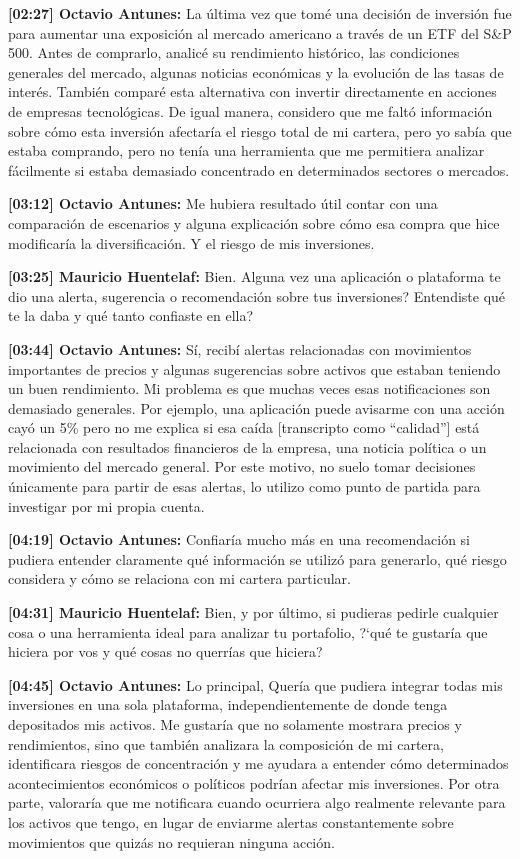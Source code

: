 \par\noindent\textbf{[02:27] Octavio Antunes:} La última vez que tomé una decisión de inversión fue para aumentar una exposición al mercado americano a través de un ETF del S\&P 500. Antes de comprarlo, analicé su rendimiento histórico, las condiciones generales del mercado, algunas noticias económicas y la evolución de las tasas de interés. También comparé esta alternativa con invertir directamente en acciones de empresas tecnológicas. De igual manera, considero que me faltó información sobre cómo esta inversión afectaría el riesgo total de mi cartera, pero yo sabía que estaba comprando, pero no tenía una herramienta que me permitiera analizar fácilmente si estaba demasiado concentrado en determinados sectores o mercados.
\par\noindent\textbf{[03:12] Octavio Antunes:} Me hubiera resultado útil contar con una comparación de escenarios y alguna explicación sobre cómo esa compra que hice modificaría la diversificación. Y el riesgo de mis inversiones.
\par\noindent\textbf{[03:25] Mauricio Huentelaf:} Bien. Alguna vez una aplicación o plataforma te dio una alerta, sugerencia o recomendación sobre tus inversiones? Entendiste qué te la daba y qué tanto confiaste en ella?
\par\noindent\textbf{[03:44] Octavio Antunes:} Sí, recibí alertas relacionadas con movimientos importantes de precios y algunas sugerencias sobre activos que estaban teniendo un buen rendimiento. Mi problema es que muchas veces esas notificaciones son demasiado generales. Por ejemplo, una aplicación puede avisarme con una acción cayó un 5\% pero no me explica si esa caída [transcripto como \enquote{calidad}] está relacionada con resultados financieros de la empresa, una noticia política o un movimiento del mercado general. Por este motivo, no suelo tomar decisiones únicamente para partir de esas alertas, lo utilizo como punto de partida para investigar por mi propia cuenta.
\par\noindent\textbf{[04:19] Octavio Antunes:} Confiaría mucho más en una recomendación si pudiera entender claramente qué información se utilizó para generarlo, qué riesgo considera y cómo se relaciona con mi cartera particular.
\par\noindent\textbf{[04:31] Mauricio Huentelaf:} Bien, y por último, si pudieras pedirle cualquier cosa o una herramienta ideal para analizar tu portafolio, ?`qué te gustaría que hiciera por vos y qué cosas no querrías que hiciera?
\par\noindent\textbf{[04:45] Octavio Antunes:} Lo principal, Quería que pudiera integrar todas mis inversiones en una sola plataforma, independientemente de donde tenga depositados mis activos. Me gustaría que no solamente mostrara precios y rendimientos, sino que también analizara la composición de mi cartera, identificara riesgos de concentración y me ayudara a entender cómo determinados acontecimientos económicos o políticos podrían afectar mis inversiones. Por otra parte, valoraría que me notificara cuando ocurriera algo realmente relevante para los activos que tengo, en lugar de enviarme alertas constantemente sobre movimientos que quizás no requieran ninguna acción.

